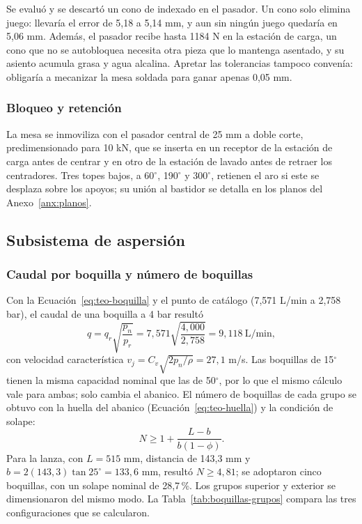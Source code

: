 Se evaluó y se descartó un cono de indexado en el pasador. Un cono solo elimina juego: llevaría el error de 5,18 a 5,14 mm, y aun sin ningún juego quedaría en 5,06 mm. Además, el pasador recibe hasta 1184 N en la estación de carga, un cono que no se autobloquea necesita otra pieza que lo mantenga asentado, y su asiento acumula grasa y agua alcalina. Apretar las tolerancias tampoco convenía: obligaría a mecanizar la mesa soldada para ganar apenas 0,05 mm.

\subsubsection{Bloqueo y retención}

La mesa se inmoviliza con el pasador central de 25 mm a doble corte, predimensionado para 10 kN, que se inserta en un receptor de la estación de carga antes de centrar y en otro de la estación de lavado antes de retraer los centradores. Tres topes bajos, a 60$^\circ$, 190$^\circ$ y 300$^\circ$, retienen el aro si este se desplaza sobre los apoyos; su unión al bastidor se detalla en los planos del Anexo~\ref{anx:planos}.

\subsection{Subsistema de aspersión}
\label{sec:dimensionamiento-aspersion}

\subsubsection{Caudal por boquilla y número de boquillas}

Con la Ecuación~\eqref{eq:teo-boquilla} y el punto de catálogo (7,571 L/min a 2,758 bar), el caudal de una boquilla a 4 bar resultó
\begin{equation}
q=q_r\sqrt{\frac{p_n}{p_r}}=7{,}571\sqrt{\frac{4{,}000}{2{,}758}}=9{,}118\ \mathrm{L/min},
\label{eq:dis-q-boquilla}
\end{equation}
con velocidad característica $v_j=C_v\sqrt{2p_n/\rho}=27{,}1$ m/s. Las boquillas de 15$^\circ$ tienen la misma capacidad nominal que las de 50$^\circ$, por lo que el mismo cálculo vale para ambas; solo cambia el abanico. El número de boquillas de cada grupo se obtuvo con la huella del abanico (Ecuación~\eqref{eq:teo-huella}) y la condición de solape:
\begin{equation}
N\geq1+\frac{L-b}{b(1-\phi)}.
\label{eq:dis-numero-boquillas}
\end{equation}
Para la lanza, con $L=515$ mm, distancia de 143,3 mm y $b=2(143{,}3)\tan25^\circ=133{,}6$ mm, resultó $N\geq4{,}81$; se adoptaron cinco boquillas, con un solape nominal de 28,7\,\%. Los grupos superior y exterior se dimensionaron del mismo modo. La Tabla~\ref{tab:boquillas-grupos} compara las tres configuraciones que se calcularon.

